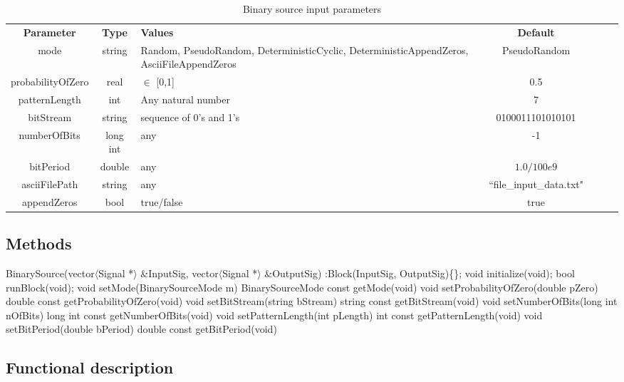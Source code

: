\begin{table}[h]
	\centering
	\begin{tabular}{|c|c|p{60mm}|c|ccp{60mm}}
		\cline{1-4}
		\textbf{Parameter} & \textbf{Type} & \textbf{Values} &   \textbf{Default}& \\ \cline{1-4}
		mode & string & Random, PseudoRandom, DeterministicCyclic, DeterministicAppendZeros, AsciiFileAppendZeros & PseudoRandom \\ \cline{1-4}
		probabilityOfZero & real & $\in$ [0,1] & 0.5 \\ \cline{1-4}
		patternLength & int &  Any natural number & 7 \\ \cline{1-4}
		bitStream & string & sequence of 0's and 1's & 0100011101010101 \\ \cline{1-4}
		numberOfBits & long int & any & -1 \\ \cline{1-4}
		bitPeriod & double & any & $1.0/100e9$ \\ \cline{1-4}
        asciiFilePath & string & any & ``file\_input\_data.txt" \\ \cline{1-4}
        appendZeros & bool & true/false & true \\ \cline{1-4}
	\end{tabular}
	\caption{Binary source input parameters}
	\label{table:bin_sour_in_par}
\end{table}

\subsection*{Methods}

BinarySource(vector$\langle$Signal *$\rangle$ \&InputSig, vector$\langle$Signal *$\rangle$ \&OutputSig) :Block(InputSig, OutputSig)\{\};
\bigbreak	
void initialize(void);
\bigbreak	
bool runBlock(void);
\bigbreak	
void setMode(BinarySourceMode m)
BinarySourceMode const getMode(void)
\bigbreak	
void setProbabilityOfZero(double pZero)
\bigbreak
double const getProbabilityOfZero(void)
\bigbreak	
void setBitStream(string bStream)
\bigbreak
string const getBitStream(void)
\bigbreak	
void setNumberOfBits(long int nOfBits)
\bigbreak
long int const getNumberOfBits(void)
\bigbreak	
void setPatternLength(int pLength)
\bigbreak
int const getPatternLength(void)
\bigbreak	
void setBitPeriod(double bPeriod)
\bigbreak
double const getBitPeriod(void)

\subsection*{Functional description}

